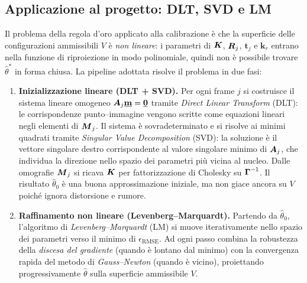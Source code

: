 \subsection{Applicazione al progetto: DLT, SVD e LM}
\label{sub:pipeline_calibrazione}

Il problema della regola d'oro applicato alla calibrazione è che
la superficie delle configurazioni ammissibili \(V\) è
\emph{non lineare}: i parametri di \(\boldsymbol{K}\), \(\boldsymbol{R}_j\),
\(\mathbf{t}_j\) e \(\mathbf{k}_r\) entrano nella funzione di
riproiezione in modo polinomiale, quindi non è possibile trovare
\(\hat\theta^*\) in forma chiusa. La pipeline adottata risolve il
problema in due fasi:

\begin{enumerate}

  \item \textbf{Inizializzazione lineare (DLT + SVD).}
  Per ogni frame \(j\) si costruisce il sistema lineare omogeneo
  \(\boldsymbol{A}_j\underline{\mathbf{m}}=\underline{\mathbf{0}}\) tramite \emph{Direct Linear
  Transform} (DLT): le corrispondenze punto--immagine vengono scritte
  come equazioni lineari negli elementi di \(\boldsymbol{M}_j\).
  Il sistema è sovradeterminato e si risolve ai minimi quadrati
  tramite \emph{Singular Value Decomposition} (SVD): la soluzione è
  il vettore singolare destro corrispondente al valore singolare
  minimo di \(\boldsymbol{A}_j\), che individua la direzione nello spazio
  dei parametri più vicina al nucleo. Dalle omografie \(\boldsymbol{M}_j\)
  si ricava \(\boldsymbol{K}\) per fattorizzazione di Cholesky su
  \(\boldsymbol{\Gamma}^{-1}\). Il risultato \(\hat\theta_0\) è una buona
  approssimazione iniziale, ma non giace ancora su \(V\) poiché
  ignora distorsione e rumore.

  \item \textbf{Raffinamento non lineare (Levenberg--Marquardt).}
  Partendo da \(\hat\theta_0\), l'algoritmo di
  \emph{Levenberg--Marquardt} (LM) si muove iterativamente nello
  spazio dei parametri verso il minimo di \(\epsilon_{\mathrm{RMSE}}\).
  Ad ogni passo combina la robustezza della \emph{discesa del
  gradiente} (quando è lontano dal minimo) con la convergenza rapida
  del metodo di \emph{Gauss--Newton} (quando è vicino), proiettando
  progressivamente \(\hat\theta\) sulla superficie ammissibile \(V\).

\end{enumerate}
